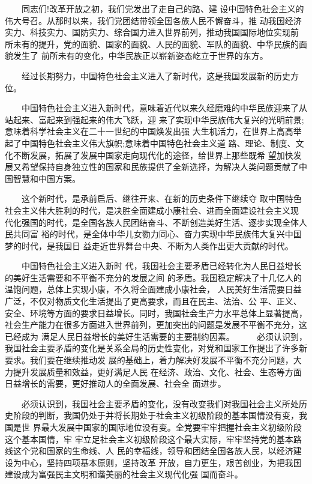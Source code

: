 \documentclass[11pt]{ctexart}
\begin{document}
{{{{　　同志们!改革开放之初，我们党发出了走自己的路、建
设中国特色社会主义的伟大号召。从那时以来，我们党团结带领全国各族人民不懈奋斗，推
动我国经济实力、科技实力、国防实力、综合国力进入世界前列，推动我国国际地位实现前
所未有的提升，党的面貌、国家的面貌、人民的面貌、军队的面貌、中华民族的面貌发生了
前所未有的变化，中华民族正以崭新姿态屹立于世界的东方。

　　经过长期努力，中国特色社会主义进入了新时代，这是我国发展新的历史方位。

　　中国特色社会主义进入新时代，意味着近代以来久经磨难的中华民族迎来了从站起来、富起来到强起来的伟大飞跃，迎
来了实现中华民族伟大复兴的光明前景;意味着科学社会主义在二十一世纪的中国焕发出强
大生机活力，在世界上高高举起了中国特色社会主义伟大旗帜;意味着中国特色社会主义道
路、理论、制度、文化不断发展，拓展了发展中国家走向现代化的途径，给世界上那些既希
望加快发展又希望保持自身独立性的国家和民族提供了全新选择，为解决人类问题贡献了中
国智慧和中国方案。

　　这个新时代，是承前启后、继往开来、在新的历史条件下继续夺
取中国特色社会主义伟大胜利的时代，是决胜全面建成小康社会、进而全面建设社会主义现
代化强国的时代，是全国各族人民团结奋斗、不断创造美好生活、逐步实现全体人民共同富
裕的时代，是全体中华儿女勠力同心、奋力实现中华民族伟大复兴中国梦的时代，是我国日
益走近世界舞台中央、不断为人类作出更大贡献的时代。

　　中国特色社会主义进入新时
代，我国社会主要矛盾已经转化为人民日益增长的美好生活需要和不平衡不充分的发展之间
的矛盾。我国稳定解决了十几亿人的温饱问题，总体上实现小康，不久将全面建成小康社会，
人民美好生活需要日益广泛，不仅对物质文化生活提出了更高要求，而且在民主、法治、公
平、正义、安全、环境等方面的要求日益增长。同时，我国社会生产力水平总体上显著提高，
社会生产能力在很多方面进入世界前列，更加突出的问题是发展不平衡不充分，这已经成为
满足人民日益增长的美好生活需要的主要制约因素。
　
　必须认识到，我国社会主要矛盾的变化是关系全局的历史性变化，对党和国家工作提出了许多新要求。我们要在继续推动发
展的基础上，着力解决好发展不平衡不充分问题，大力提升发展质量和效益，更好满足人民
在经济、政治、文化、社会、生态等方面日益增长的需要，更好推动人的全面发展、社会全
面进步。

　　必须认识到，我国社会主要矛盾的变化，没有改变我们对我国社会主义所处历史阶段的判断，我国仍处于并将长期处于社会主义初级阶段的基本国情没有变，我国是世
界最大发展中国家的国际地位没有变。全党要牢牢把握社会主义初级阶段这个基本国情，牢
牢立足社会主义初级阶段这个最大实际，牢牢坚持党的基本路线这个党和国家的生命线、人
民的幸福线，领导和团结全国各族人民，以经济建设为中心，坚持四项基本原则，坚持改革
开放，自力更生，艰苦创业，为把我国建设成为富强民主文明和谐美丽的社会主义现代化强
国而奋斗。

}}}}
\end{document}
